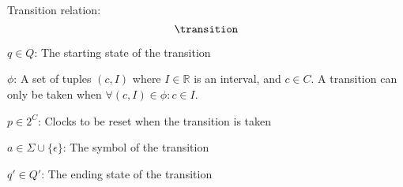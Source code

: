 
\begin{definition}\label{definition:transition}
    \cite*{Eugene2001}
    Transition relation:
    $$\transition$$

    $q\in Q$: The starting state of the transition

    $\phi$: A set of tuples $(c, I)$ where $I\in\mathbb{R}$ is an interval, and $c\in C$.
    A transition can only be taken when $\forall (c,I)\in\phi: c\in I$.

    $p\in 2^C$: Clocks to be reset when the transition is taken

    $a\in\Sigma\cup\{\epsilon\}$: The symbol of the transition

    $q'\in Q'$: The ending state of the transition
\end{definition}